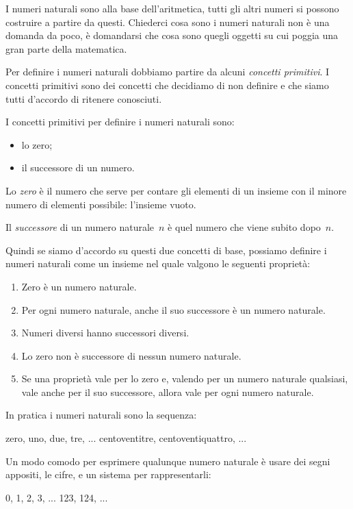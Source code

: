 I numeri naturali sono alla base dell'aritmetica, 
tutti gli altri numeri si possono costruire a partire da questi. 
Chiederci cosa sono i numeri naturali non è una domanda da poco, 
è domandarsi che cosa sono quegli oggetti su cui poggia una gran parte della
matematica.

Per definire i numeri naturali dobbiamo partire da alcuni 
\emph{concetti primitivi}. 
I concetti primitivi sono dei concetti che decidiamo di non definire e che 
siamo tutti d'accordo di ritenere conosciuti.

I concetti primitivi per definire i numeri naturali sono:

\begin{itemize}[noitemsep]
 \item lo zero;
 \item il successore di un numero.
\end{itemize}

Lo \emph{zero} è il numero che serve per contare gli elementi di un insieme 
con il minore numero di elementi possibile: l'insieme vuoto.

Il \emph{successore} di un numero naturale~\(n\) è quel numero che viene 
subito dopo~\(n\).

Quindi se siamo d'accordo su questi due concetti di base, possiamo definire 
i numeri naturali come un insieme nel quale valgono le seguenti proprietà:

\begin{enumerate}[noitemsep]
 \item Zero è un numero naturale.
 \item Per ogni numero naturale, anche il suo successore è un numero 
naturale.
 \item Numeri diversi hanno successori diversi.
 \item Lo zero non è successore di nessun numero naturale.
 \item Se una proprietà vale per lo zero e, 
   valendo per un numero naturale qualsiasi, 
   vale anche per il suo successore, 
   allora vale per ogni numero naturale.
\end{enumerate}

In pratica i numeri naturali sono la sequenza:

 zero, uno, due, tre, ... centoventitre, centoventiquattro, ...

Un modo comodo per esprimere qualunque numero naturale è usare dei segni 
appositi, le cifre, e un sistema per rappresentarli:

 0, 1, 2, 3, ... 123, 124, ...

